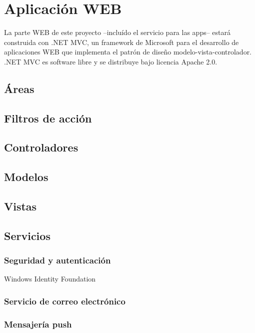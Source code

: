 \chapter{Aplicación WEB}
La parte WEB de este proyecto  --incluído el servicio para las apps-- estará construida con .NET MVC, un framework de Microsoft para el desarrollo de aplicaciones WEB que implementa el patrón de diseño modelo-vista-controlador. .NET MVC es software libre y se distribuye bajo licencia Apache 2.0.

\section{Áreas}

\section{Filtros de acción}

\section{Controladores}

\section{Modelos}

\section{Vistas}

\section{Servicios}
\subsection{Seguridad y autenticación}
Windows Identity Foundation
\subsection{Servicio de correo electrónico}
\subsection{Mensajería push}